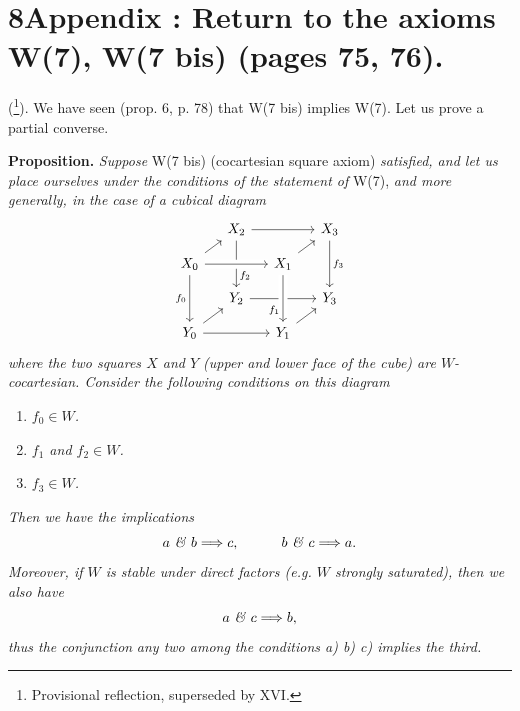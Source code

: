 
\section*{8\quad Appendix : Return to the axioms W(7), W(7 bis) (pages 75, 76).}

(\footnote[135]{Provisional reflection, superseded by XVI.}). We have seen (prop. 6, p. 78) that W(7 bis) implies W(7). Let us prove a partial converse. %

\textbf{Proposition.} \textit{Suppose} W(7 bis) (cocartesian square axiom) \textit{satisfied, and let us place ourselves under the conditions of the statement of} W(7), \textit{and more generally, in the case of a cubical diagram}
\[
\begin{tikzcd}[ampersand replacement=\&, row sep=small, column sep=small]
 \& X_2 \arrow[rr] \arrow[dd, "f_2" near end] \& \& X_3 \arrow[dd, "f_3"] \\
X_0 \arrow[ur] \arrow[rr, crossing over] \arrow[dd, "f_0"'] \& \& X_1 \arrow[ur] \& \\
 \& Y_2 \arrow[rr] \& \& Y_3 \\
Y_0 \arrow[ur] \arrow[rr] \& \& Y_1 \arrow[ur] \arrow[from=uu, crossing over, "f_1"' near end] \&
\end{tikzcd}
\]
\textit{where the two squares $X$ and $Y$ (upper and lower face of the cube) are $W$-cocartesian. Consider the following conditions on this diagram}
\begin{enumerate}[label={}]
\item[\textit{a)}] \textit{$f_0 \in W$.}
\item[\textit{b)}] \textit{$f_1$ and $f_2 \in W$.}
\item[\textit{c)}] \textit{$f_3 \in W$.}
\end{enumerate}
\textit{Then we have the implications}
\[
a \text{ \textit{\&} } b \Longrightarrow c, \qquad\quad b \text{ \textit{\&} } c \Longrightarrow a.
\]
\textit{Moreover, if $W$ is stable under direct factors (e.g. $W$ strongly saturated), then we also have}
\[
a \text{ \textit{\&} } c \Longrightarrow b,
\]
\textit{thus the conjunction} \textit{any two among the conditions a) b) c) implies the third.}

